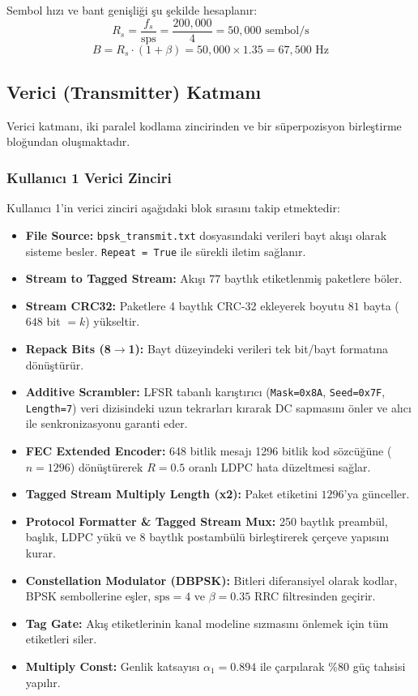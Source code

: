 Sembol hızı ve bant genişliği şu şekilde hesaplanır:
\begin{equation}
R_s = \frac{f_s}{\text{sps}} = \frac{200{,}000}{4} = 50{,}000 \text{ sembol/s}
\end{equation}
\begin{equation}
B = R_s \cdot (1 + \beta) = 50{,}000 \times 1.35 = 67{,}500 \text{ Hz}
\end{equation}

\subsection{Verici (Transmitter) Katmanı}
Verici katmanı, iki paralel kodlama zincirinden ve bir süperpozisyon birleştirme bloğundan oluşmaktadır.

\subsubsection{Kullanıcı 1 Verici Zinciri}
Kullanıcı 1'in verici zinciri aşağıdaki blok sırasını takip etmektedir:
\begin{itemize}
    \item \textbf{File Source:} \texttt{bpsk\_transmit.txt} dosyasındaki verileri bayt akışı olarak sisteme besler. \texttt{Repeat = True} ile sürekli iletim sağlanır.
    \item \textbf{Stream to Tagged Stream:} Akışı $77$ baytlık etiketlenmiş paketlere böler.
    \item \textbf{Stream CRC32:} Paketlere 4 baytlık CRC-32 ekleyerek boyutu $81$ bayta ($648$ bit $= k$) yükseltir.
    \item \textbf{Repack Bits (8$\to$1):} Bayt düzeyindeki verileri tek bit/bayt formatına dönüştürür.
    \item \textbf{Additive Scrambler:} LFSR tabanlı karıştırıcı (\texttt{Mask=0x8A}, \texttt{Seed=0x7F}, \texttt{Length=7}) veri dizisindeki uzun tekrarları kırarak DC sapmasını önler ve alıcı ile senkronizasyonu garanti eder.
    \item \textbf{FEC Extended Encoder:} 648 bitlik mesajı 1296 bitlik kod sözcüğüne ($n=1296$) dönüştürerek $R=0.5$ oranlı LDPC hata düzeltmesi sağlar.
    \item \textbf{Tagged Stream Multiply Length (x2):} Paket etiketini $1296$'ya günceller.
    \item \textbf{Protocol Formatter \& Tagged Stream Mux:} 250 baytlık preambül, başlık, LDPC yükü ve 8 baytlık postambülü birleştirerek çerçeve yapısını kurar.
    \item \textbf{Constellation Modulator (DBPSK):} Bitleri diferansiyel olarak kodlar, BPSK sembollerine eşler, $\text{sps}=4$ ve $\beta=0.35$ RRC filtresinden geçirir.
    \item \textbf{Tag Gate:} Akış etiketlerinin kanal modeline sızmasını önlemek için tüm etiketleri siler.
    \item \textbf{Multiply Const:} Genlik katsayısı $\alpha_1 = 0.894$ ile çarpılarak \%80 güç tahsisi yapılır.
\end{itemize}


